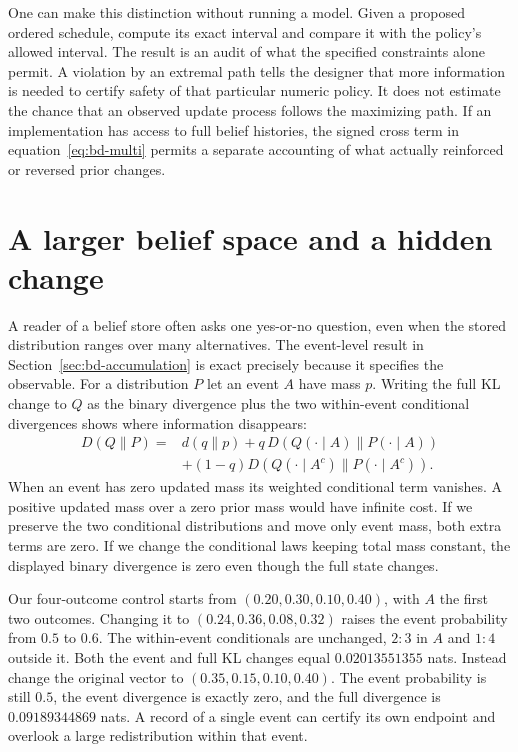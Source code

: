 \documentclass[12pt,letterpaper]{article}
\begin{document}
One can make this distinction without running a model. Given a proposed ordered schedule, compute its exact interval and compare it with the policy's allowed interval. The result is an audit of what the specified constraints alone permit. A violation by an extremal path tells the designer that more information is needed to certify safety of that particular numeric policy. It does not estimate the chance that an observed update process follows the maximizing path. If an implementation has access to full belief histories, the signed cross term in equation~\eqref{eq:bd-multi} permits a separate accounting of what actually reinforced or reversed prior changes.

\section{A larger belief space and a hidden change}
A reader of a belief store often asks one yes-or-no question, even when the stored distribution ranges over many alternatives. The event-level result in Section~\ref{sec:bd-accumulation} is exact precisely because it specifies the observable. For a distribution \(P\) let an event \(A\) have mass \(p\). Writing the full KL change to \(Q\) as the binary divergence plus the two within-event conditional divergences shows where information disappears:
\[
 \begin{split}
 D(Q\|P)={}&d(q\|p)
       +q\,D(Q(\cdot\mid A)\|P(\cdot\mid A))\\
       &+(1-q)D(Q(\cdot\mid A^c)\|P(\cdot\mid A^c)).
 \end{split}
\]
When an event has zero updated mass its weighted conditional term vanishes. A positive updated mass over a zero prior mass would have infinite cost. If we preserve the two conditional distributions and move only event mass, both extra terms are zero. If we change the conditional laws keeping total mass constant, the displayed binary divergence is zero even though the full state changes.

Our four-outcome control starts from \((0.20,0.30,0.10,0.40)\), with \(A\) the first two outcomes. Changing it to \((0.24,0.36,0.08,0.32)\) raises the event probability from \(0.5\) to \(0.6\). The within-event conditionals are unchanged, \(2:3\) in \(A\) and \(1:4\) outside it. Both the event and full KL changes equal \(0.02013551355\) nats. Instead change the original vector to \((0.35,0.15,0.10,0.40)\). The event probability is still \(0.5\), the event divergence is exactly zero, and the full divergence is \(0.09189344869\) nats. A record of a single event can certify its own endpoint and overlook a large redistribution within that event.
\end{document}
